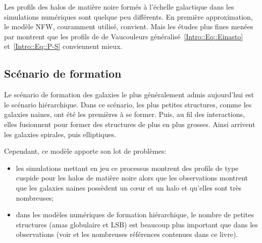 			Les profils des halos de matière noire formés à l'échelle
			galactique dans les simulations numériques sont quelque
			peu différents. En première approximation, le modèle
			NFW, couramment utilisé, convient. Mais les études plus
			fines menées par \cite{2006AJ....132.2685M,2006AJ....132.2701G,2006AJ....132.2711G} montrent que
			les profils de de Vaucouleurs généralisé~\ref{Intro::Eq::Einasto} et~\ref{Intro::Eq::P-S} conviennent mieux.


		\subsection{Scénario de formation}
			Le scénario de formation des galaxies le plus généralement admis aujourd'hui est le scénario
			hiérarchique. Dans ce scénario, les plus petites structures, comme les galaxies naines, ont
			été les premières à se former. Puis, au fil des interactions, elles fusionnent pour former
			des structures de plus en plus grosses. Ainsi arrivent les galaxies spirales, puis
			elliptiques.


			Cependant, ce modèle apporte son lot de problèmes:
			\begin{itemize}
				\item les simulations mettant en jeu ce processus montrent des profils de type cuspide pour les halos de matière noire
					alors que les observations montrent que les galaxies naines possèdent un cœur et un halo et qu'elles sont très
					nombreuses;
				\item dans les modèles numériques de formation hiérarchique, le nombre de petites
					structures (amas globulaire et LSB) est beaucoup plus important que dans les
					observations (voir \citet{2006CombesBook} et les nombreuses références contenues dans ce livre).
			\end{itemize}

